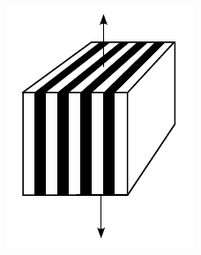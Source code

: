 \begin{figure}[hbtp]
\centering
\begin{subfigure}[b]{0.35\textwidth}
            \centering
            \includegraphics[width=\textwidth]{figures/voigt_mixture_rule}
            \caption{}
            \label{subfig:voigt_mixture_rule}
    \end{subfigure} \hfill
    \begin{subfigure}[b]{0.35\textwidth}
            \centering

\end{subfigure}
\end{figure}
